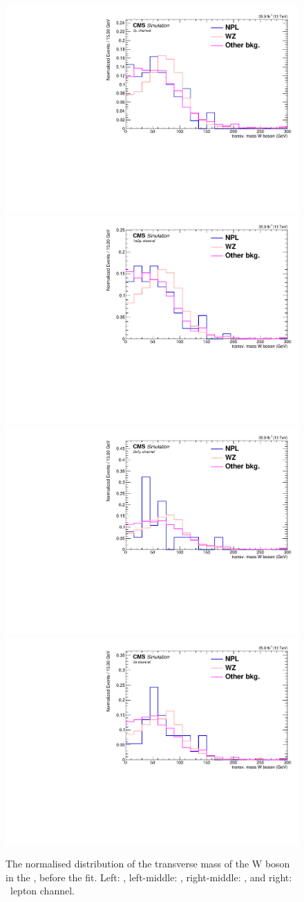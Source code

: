 \begin{figure}[htbp]
	\centering
	\includegraphics[width=0.49\linewidth]{6_Search/Figures/MTWnormalised/MTW_uuu_Normalized}
	\includegraphics[width=0.49\linewidth]{6_Search/Figures/MTWnormalised/MTW_uue_Normalized}
	\includegraphics[width=0.49\linewidth]{6_Search/Figures/MTWnormalised/MTW_eeu_Normalized}
	\includegraphics[width=0.49\linewidth]{6_Search/Figures/MTWnormalised/MTW_eee_Normalized}
	\caption{The normalised distribution of the transverse mass of the W boson in the \WZCR, before the fit. Left: \mumumu, left-middle: \emumu, right-middle: \eemu, and right: \eee\ lepton channel.  }
	\label{fig:mtwnorm}
\end{figure}
